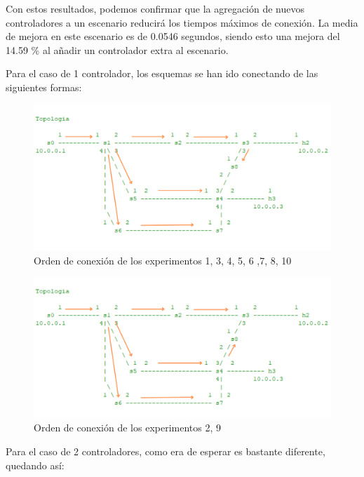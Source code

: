 \documentclass[a4paper, 12pt]{book}
\begin{document}
 	Con estos resultados, podemos confirmar que la agregación de nuevos controladores a un escenario reducirá los tiempos máximos de conexión. La media de mejora en este escenario es de 0.0546 segundos, siendo esto una mejora del 14.59 \% al añadir un controlador extra al escenario.
 	
 	 	
 	Para el caso de 1 controlador, los esquemas se han ido conectando de las siguientes formas:
 	
 	\begin{figure}[H]
 		\centering
 		\includegraphics[width=16cm, keepaspectratio]{img/escenario1_1c_1}
 		\caption{Orden de conexión de los experimentos 1, 3, 4, 5, 6 ,7, 8, 10}
 		\label{figura:escenario1_1c_1}
 	\end{figure}
 	
 	\begin{figure}[H]
 		\centering
 		\includegraphics[width=16cm, keepaspectratio]{img/escenario1_1c_2}
 		\caption{Orden de conexión de los experimentos 2, 9}
 		\label{figura:escenario1_1c_2}
 	\end{figure}
 	
 	Para el caso de 2 controladores, como era de esperar es bastante diferente, quedando así:
 	
\end{document}

